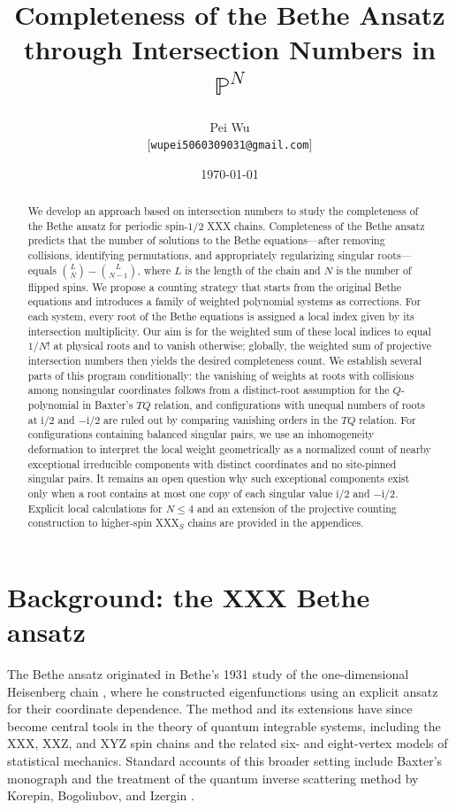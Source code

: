 \documentclass[11pt]{article}
\title{Completeness of the Bethe Ansatz through Intersection Numbers in $\mathbb{P}^N$}
\author{Pei Wu\\\small[\texttt{wupei5060309031@gmail.com}]}
\date{\today}
\theoremstyle{definition}
\newcommand{\ii}{\mathrm{i}}
\begin{document}
\maketitle

\begin{abstract}
We develop an approach based on intersection numbers to study the
completeness of the Bethe ansatz for periodic spin-$1/2$ XXX chains.
Completeness of the Bethe ansatz predicts that the number of
solutions to the Bethe equations---after removing collisions, identifying
permutations, and appropriately regularizing singular roots---equals
$\binom{L}{N}-\binom{L}{N-1}$, where $L$ is the length of the
chain and $N$ is the number of flipped spins.
We propose a counting strategy that starts from the original Bethe
equations and introduces a family of weighted polynomial systems
as corrections. For each system, every root of the Bethe equations
is assigned a local index given by its intersection multiplicity. Our aim is for
the weighted sum of these local indices to equal $1/N!$
at physical roots and to vanish otherwise; globally,
the weighted sum of projective intersection numbers then yields the desired
completeness count. We establish several parts of this program conditionally:
the vanishing of weights at roots
with collisions among nonsingular coordinates follows from a
distinct-root assumption for the $Q$-polynomial in Baxter's $TQ$
relation, and configurations with unequal numbers of roots at $\ii/2$ and
$-\ii/2$ are ruled out by comparing vanishing orders in the $TQ$ relation.
For configurations containing balanced singular pairs, we use an inhomogeneity
deformation to interpret the local weight geometrically as a normalized count of nearby
exceptional irreducible components with distinct coordinates and no site-pinned singular pairs.
It remains an open question why such exceptional components exist only when a root contains
at most one copy of each singular value $\ii/2$ and $-\ii/2$. Explicit local calculations for $N\le 4$ and an extension of the projective counting construction to higher-spin XXX$_S$ chains are provided in the appendices.
\end{abstract}

\section{Background: the XXX Bethe ansatz}
\label{sec:background}

The Bethe ansatz originated in Bethe's 1931 study of the
one-dimensional Heisenberg chain \cite{Bethe1931}, where he constructed
eigenfunctions using an explicit ansatz for their coordinate dependence.
The method and its extensions have since become central tools in the theory of
quantum integrable systems, including the XXX, XXZ, and XYZ spin chains
and the related six- and eight-vertex models of statistical mechanics. Standard accounts of this broader setting include Baxter's
monograph \cite{Baxter1982} and the treatment of the quantum inverse
scattering method by Korepin, Bogoliubov, and Izergin \cite{KBI1993}.
\end{document}
